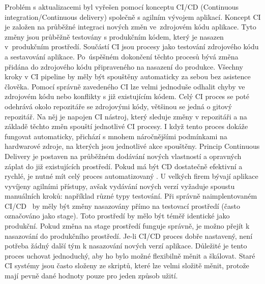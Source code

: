 Problém s aktualizacemi byl vyřešen pomocí konceptu CI/CD (Continuous integration/Continuous delivery) společně s agilním vývojem aplikací. Koncept CI je založen na průběžné integraci nových změn ve zdrojovém kódu aplikace. Tyto změny jsou průběžně testovány s produkčním kódem, který je nasazen v produkčním prostředí. Součástí CI jsou procesy jako testování zdrojového kódu a sestavování aplikace. Po úspěšném dokončení těchto procesů bývá změna přidána do zdrojového kódu připraveného na nasazení do produkce. Všechny kroky v CI pipeline by měly být spouštěny automaticky za sebou bez asistence člověka. Pomocí správně zavedeného CI lze velmi jednoduše odhalit chyby ve zdrojovém kódu nebo konflikty s již existujícím kódem. Celý CI proces se poté odehrává okolo repozitáře se zdrojovými kódy, většinou se jedná o gitový repozitář. Na něj je napojen CI nástroj, který sleduje změny v repozitáři a na základě těchto změn spouští jednotlivé CI procesy. I když tento proces dokáže fungovat automaticky, přichází s mnohem náročnějšími podmínkami na hardwarové zdroje, na kterých jsou jednotlivé akce spouštěny. Princip Continuous Delivery je postaven na průběžném dodávání nových vlastností a opravných záplat do již existujících prostředí. Pokud má být CD dostatečně efektivní a rychlé, je nutné mít celý proces automatizovaný \cite{cicd_fullauto}. U velkých firem bývají aplikace vyvíjeny agilními přístupy, avšak vydávání nových verzí vyžaduje spoustu manuálních kroků: například různé typy testování. Při správně naimplentovaném CI/CD  by měly být změny nasazovány přímo na testovací prostředí (často označováno jako stage). Toto prostředí by mělo být téměř identické jako produkční. Pokud změna na stage prostředí funguje správně, je možno přejít k nasazování do produkčního prostředí. Je-li CI/CD proces dobře nastavený, není potřeba žádný další tým k nasazování nových verzí aplikace. Důležité je tento proces uchovat jednoduchý, aby ho bylo možné flexibilně měnit a škálovat. Staré CI systémy jsou často složeny ze skriptů, které lze velmi složitě měnit, protože mají pevně dané hodnoty pouze pro jeden způsob užití.
